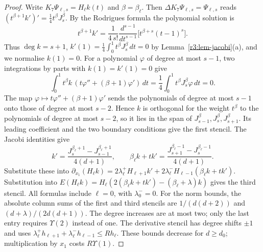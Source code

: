 \begin{proof}
Write $K_7\Psi_{\ell,s}=H_\ell k(t)$ and $\beta=\beta_\ell$. Then $\Delta K_7\Psi_{\ell,s}=\Psi_{\ell,s}$ reads $(t^{\beta+1}k')'=\frac14t^\beta J^\beta_s$. By the Rodrigues formula the polynomial solution is
\[
t^{\beta+1}k'=\frac1{4\,s!}\frac{d^{s-1}}{dt^{s-1}}\big[t^{\beta+s}(t-1)^s\big].
\]
Thus $\deg k=s+1$, $k'(1)=\frac14\int_0^1t^\beta J^\beta_s\,dt=0$ by Lemma~\ref{r3:lem-jacobi}(a), and we normalise $k(1)=0$. For a polynomial $\varphi$ of degree at most $s-1$, two integrations by parts with $k(1)=k'(1)=0$ give
\[
\int_0^1t^\beta k\,(t\varphi''+(\beta+1)\varphi')\,dt
=\frac14\int_0^1t^\beta J^\beta_s\varphi\,dt=0.
\]
The map $\varphi\mapsto t\varphi''+(\beta+1)\varphi'$ sends the polynomials of degree at most $s-1$ onto those of degree at most $s-2$. Hence $k$ is orthogonal for the weight $t^\beta$ to the polynomials of degree at most $s-2$, so it lies in the span of $J^\beta_{s-1},J^\beta_s,J^\beta_{s+1}$. Its leading coefficient and the two boundary conditions give the first stencil. The Jacobi identities give
\[
k'=\frac{J_s^{\beta_\ell+1}-J_{s-1}^{\beta_\ell+1}}{4(d+1)},\qquad
\beta_\ell k+tk'=\frac{J_{s+1}^{\beta_\ell-1}-J_s^{\beta_\ell-1}}{4(d+1)}.
\]
Substitute these into $\partial_{x_1}(H_\ell k)=2\lambda^+_\ell H_{\ell+1}k'+2\lambda^-_\ell H_{\ell-1}(\beta_\ell k+tk')$. Substitution into $E(H_\ell k)=H_\ell(2(\beta_\ell k+tk')-(\beta_\ell+\lambda)k)$ gives the third stencil. All formulas include $\ell=0$, with $\lambda^-_0=0$. For the norm bounds, the absolute column sums of the first and third stencils are $1/(d(d+2))$ and $(d+\lambda)/(2d(d+1))$. The degree increases are at most two; only the last entry requires $\Upsilon(2)$ instead of one. The derivative stencil has degree shifts $\pm1$ and uses $\lambda^+_\ell h_{\ell+1}+\lambda^-_\ell h_{\ell-1}\leq Rh_\ell$. These bounds decrease for $d\geq d_0$; multiplication by $x_1$ costs $R\Upsilon(1)$.
\end{proof}

